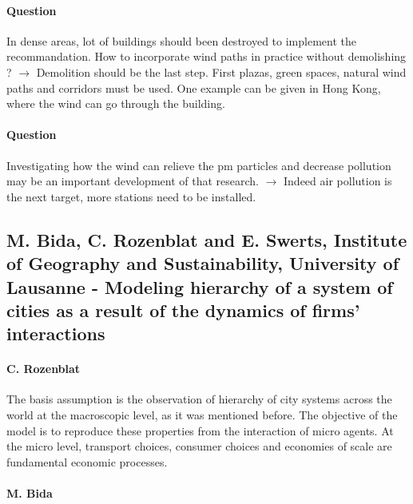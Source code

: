 \documentclass[10pt]{article}
\begin{document}
\paragraph{Question}

In dense areas, lot of buildings should been destroyed to implement the recommandation. How to incorporate wind paths in practice without demolishing ? $\rightarrow$ Demolition should be the last step. First plazas, green spaces, natural wind paths and corridors must be used. One example can be given in Hong Kong, where the wind can go through the building.

\paragraph{Question}

Investigating how the wind can relieve the pm particles and decrease pollution may be an important development of that research. $\rightarrow$ Indeed air pollution is the next target, more stations need to be installed.



\subsection*{M. Bida, C. Rozenblat and E. Swerts, Institute of Geography and
Sustainability, University of Lausanne - Modeling hierarchy of a system of cities as a result of the dynamics of firms’ interactions}

\paragraph{C. Rozenblat}

The basis assumption is the observation of hierarchy of city systems across the world at the macroscopic level, as it was mentioned before. The objective of the model is to reproduce these properties from the interaction of micro agents. At the micro level, transport choices, consumer choices and economies of scale are fundamental economic processes.


\paragraph{M. Bida}
\end{document}
